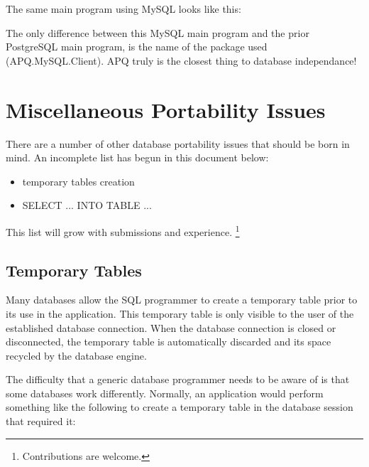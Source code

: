 \documentclass[english,letterpaper]{book}
\begin{document}
The same main program using MySQL looks like this:


The only difference between this MySQL main program and the prior
PostgreSQL main program, is the name of the package used (APQ\-.MySQL\-.Client).
APQ truly is the closest thing to database independance!


\section{Miscellaneous Portability Issues}

There are a number of other database portability issues that should
be born in mind. An incomplete list has begun in this document below:

\begin{itemize}
   \item temporary tables creation
   \item SELECT ... INTO TABLE ...
\end{itemize}

This list will grow with submissions and experience.
\footnote{Contributions are welcome.}


\subsection{Temporary Tables\label{Creating Temp Tables}}

Many databases allow the SQL programmer to create a temporary table
prior to its use in the application. This temporary table is only
visible to the user of the established database connection. When the
database connection is closed or disconnected, the temporary table
is automatically discarded and its space recycled by the database
engine.

The difficulty that a generic database programmer needs to be aware
of is that some databases work differently. Normally, an application
would perform something like the following to create a temporary table
in the database session that required it:
\end{document}
